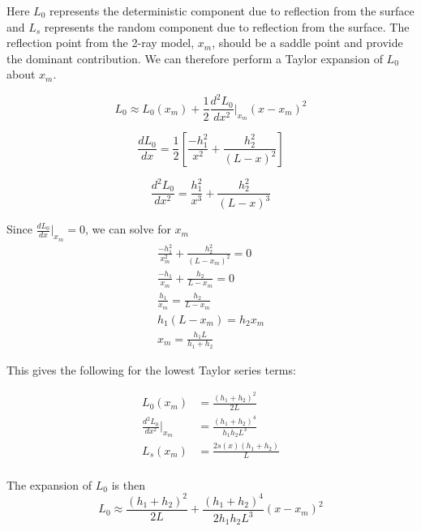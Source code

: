 Here $L_0$ represents the deterministic component due to reflection from the surface and $L_s$ represents the random component due to reflection from the surface. The reflection point from the 2-ray model, $x_m$, should be a saddle point and provide the dominant contribution. We can therefore perform a Taylor expansion of $L_0$ about $x_m$.

\begin{equation}
L_0 \approx L_0(x_m) + \frac{1}{2}\frac{d^2L_0}{dx^2}\bigg|_{x_m}(x-x_m)^2
\label{mp_eq:14}
\end{equation}

\begin{equation}
\frac{dL_0}{dx} = \frac{1}{2}\left[\frac{-h_1^2}{x^2} + \frac{h_2^2}{(L-x)^2} \right]
\label{mp_eq:15}
\end{equation}

\begin{equation}
\frac{d^2L_0}{dx^2} = \frac{h_1^2}{x^3} + \frac{h_2^2}{(L-x)^3} 
\label{mp_eq:16}
\end{equation}

Since $\frac{dL_0}{dx}\big|_{x_m} = 0$, we can solve for $x_m$
\begin{equation}
\begin{gathered}
\frac{-h_1^2}{x_m^2} + \frac{h_2^2}{(L-x_m)^2} = 0\\
\frac{-h_1}{x_m} + \frac{h_2}{L-x_m} = 0\\
\frac{h_1}{x_m} = \frac{h_2}{L-x_m}\\
h_1(L-x_m) = h_2x_m\\
x_m = \frac{h_1L}{h_1+h_2}
\end{gathered}
\label{mp_eq:17}
\end{equation}

This gives the following for the lowest Taylor series terms:

\begin{equation}
\begin{aligned}
L_0(x_m) &= \frac{(h_1+h_2)^2}{2L} \\
\frac{d^2L_0}{dx^2}\big|_{x_m}  &= \frac{(h_1+h_2)^4}{h_1h_2L^3} \\
L_s(x_m) &= \frac{2s(x)(h_1 + h_2)}{L}\\
\end{aligned}
\label{mp_eq:17a}
\end{equation}

The expansion of $L_0$ is then
\begin{equation}
L_0 \approx \frac{(h_1+h_2)^2}{2L} + \frac{(h_1+h_2)^4}{2h_1h_2L^3}(x-x_m)^2
\label{mp_eq:18}
\end{equation}

